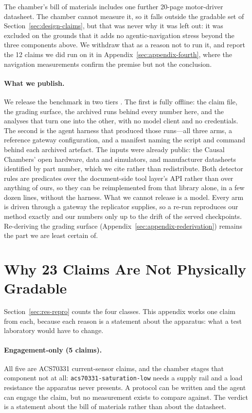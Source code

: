 \documentclass[11pt]{article}
\begin{document}
The chamber's bill of materials includes one further 20-page
motor-driver datasheet. The chamber cannot measure it, so it falls
outside the gradable set of Section~\ref{sec:design-claims}, but that
was never why it was left out: it was excluded on the grounds that it
adds no agentic-navigation stress beyond the three components above. We
withdraw that as a reason not to run it, and report the 12 claims we
did run on it in Appendix~\ref{sec:appendix-fourth}, where the
navigation measurements confirm the premise but not the conclusion.

\paragraph{What we publish.}
We release the benchmark in two tiers \citep{datasheetindex}. The first
is fully offline: the claim file, the grading surface, the archived runs
behind every number here, and the analyses that turn one into the other,
with no model client and no credentials. The second is the agent harness
that produced those runs---all three arms, a reference gateway
configuration, and a manifest naming the script and command behind each
archived artefact. The inputs were already public: the Causal Chambers'
open hardware, data and simulators, and manufacturer datasheets
identified by part number, which we cite rather than redistribute.
Both detector rules are predicates over the document-side tool layer's
API rather than over anything of ours, so they can be reimplemented from
that library alone, in a few dozen lines, without the harness.
What we cannot release is a model. Every arm is driven through a gateway
the replicator supplies, so a re-run reproduces our method exactly and
our numbers only up to the drift of the served checkpoints. Re-deriving
the grading surface (Appendix~\ref{sec:appendix-rederivation}) remains
the part we are least certain of.

\section{Why 23 Claims Are Not Physically Gradable}
\label{sec:appendix-inconclusive}

Section~\ref{sec:res-repro} counts the four classes. This appendix works
one claim from each, because each reason is a statement about the
apparatus: what a test laboratory would have to change.

\paragraph{Engagement-only (5 claims).}
All five are ACS70331 current-sensor claims, and the chamber stages that
component not at all: \texttt{acs70331-saturation-low} needs a supply
rail and a load resistance the apparatus never presents. A protocol can
be written and the agent can engage the claim, but no measurement exists
to compare against. The verdict is a statement about the bill of
materials rather than about the datasheet.
\end{document}
